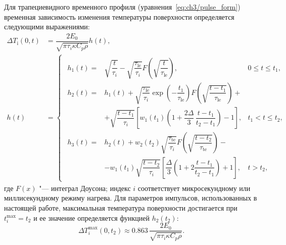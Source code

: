 Для трапециевидного временного профиля (уравнения~\cref{eq:ch3/pulse_form}) временная зависимость изменения температуры поверхности определяется следующими выражениями:
\begin{subequations}
    \label{eq:dT_usms}
    \begin{align}
        \Delta T_\mathrm{i}(0,t) & = \dfrac{2E_0}{\sqrt{\pi\tau_i \kappa C_p \rho}} h(t), \\
        h(t)                     & =
        \begin{cases}
            \begin{alignedat}{3}
                h_1(t) = & \sqrt{\dfrac{t}{\tau_i}} - \sqrt{\dfrac{\tau_\mathrm{le}}{\tau_i}} F\left( \sqrt{\dfrac{t}{\tau_\mathrm{le}}} \right),                                       & 0 \leq t \leq t_1, \\
                h_2(t) = & h_1(t) + \sqrt{\dfrac{\tau_\mathrm{le}}{\tau_i}} \exp \left( -\dfrac{t_1}{\tau_\mathrm{le}} \right) F\left( \sqrt{\dfrac{t-t_1}{\tau_\mathrm{le}}} \right) + &                    \\
                         & + \sqrt{\dfrac{t-t_1}{\tau_i}} \left[ w_1(t_1) \left( 1+\dfrac{2\Delta}{3}\, \dfrac{t-t_1}{t_2-t_1} \right) -1 \right],                                      & t_1 < t \leq t_2,  \\
                h_3(t) = & h_2(t) + w_2(t_2) \sqrt{\dfrac{\tau_\mathrm{te}}{\tau_i}} F\left( \sqrt{\dfrac{t-t_2}{\tau_\mathrm{te}}} \right) -                                           &                    \\
                         & - w_1(t_1) \sqrt{\dfrac{t-t_2}{\tau_i}} \left[ \dfrac{\Delta}{3} \left( 1 + 2 \dfrac{t-t_1}{t_2-t_1} \right) + 1 \right],                                    & t>t_2,
            \end{alignedat}
        \end{cases}
    \end{align}
\end{subequations}
где \( F(x) \) "--- интеграл Доусона; индекс \(i\) соответствует микросекундному или миллисекундному режиму нагрева. Для параметров импульсов, использованных в настоящей работе, максимальная температура поверхности достигается при \( t_i^{\max} = t_2 \) и ее значение определяется функцией \(h_2(t_2) \):
\begin{equation}
    \Delta T_i^{\max}(0,t_2) \approx \num{0.863} \, \frac{2E_0}{\sqrt{\pi \tau_i \kappa C_p \rho}}.
\end{equation}